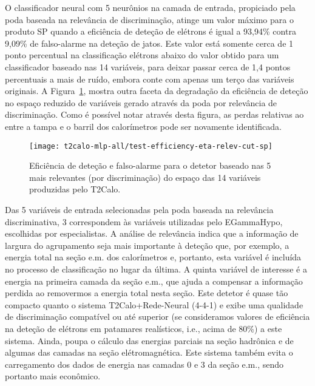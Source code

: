 O classificador neural com 5 neurônios na camada de entrada, propiciado pela
poda baseada na relevância de discriminação, atinge um valor máximo para o
produto SP quando a eficiência de deteção de elétrons é igual a 93,94\% contra
9,09\% de falso-alarme na deteção de jatos. Este valor está somente cerca de 1
ponto percentual na classificação elétrons abaixo do valor obtido para um
classificador baseado nas 14 variáveis, para deixar passar cerca de 1,4 pontos
percentuais a mais de ruído, embora conte com apenas um terço das variáveis
originais. A Figura~\ref{fig:t2calo-mlp-all-test-efficiency-eta-relev-cut-sp},
mostra outra faceta da degradação da eficiência de deteção no espaço reduzido
de variáveis gerado através da poda por relevância de discriminação. Como é
possível notar através desta figura, as perdas relativas ao  entre
a tampa e o barril dos calorímetros pode ser novamente identificada.

\begin{figure}
\begin{center}
\texttt{[image: t2calo-mlp-all/test-efficiency-eta-relev-cut-sp]}
\end{center}
\caption{Eficiência de deteção e falso-alarme para o detetor baseado nas 5
mais relevantes (por discriminação) do espaço das 14 variáveis produzidas pelo
T2Calo.}
\label{fig:t2calo-mlp-all-test-efficiency-eta-relev-cut-sp}
\end{figure}

Das 5 variáveis de entrada selecionadas pela poda baseada na relevância
discriminativa, 3 correspondem às variáveis utilizadas pelo EGammaHypo,
escolhidas por especialistas. A análise de relevância indica que a informação
de largura do agrupamento seja mais importante à deteção que, por exemplo, a
energia total na seção e.m. dos calorímetros e, portanto, esta variável é
incluída no processo de classificação no lugar da última. A quinta variável de
interesse é a energia na primeira camada da seção e.m., que ajuda a compensar
a informação perdida ao removermos a energia total nesta seção. Este detetor é
quase tão compacto quanto o sistema T2Calo+Rede-Neural (4-4-1) e exibe uma
qualidade de discriminação compatível ou até superior (se consideramos valores
de eficiência na deteção de elétrons em patamares realísticos, i.e., acima de
80\%) a este sistema. Ainda, poupa o cálculo das energias parciais na seção
hadrônica e de algumas das camadas na seção elétromagnética. Este sistema
também evita o carregamento dos dados de energia nas camadas 0 e 3 da seção
e.m., sendo portanto mais econômico.

